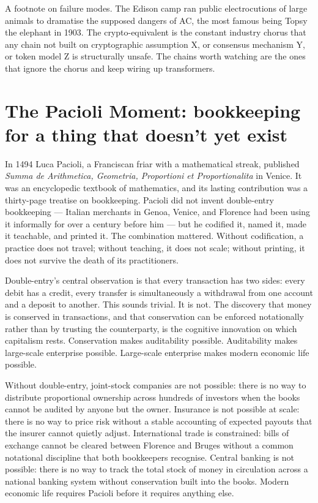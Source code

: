 \documentclass[11pt,a4paper]{article}
\begin{document}
A footnote on failure modes. The Edison camp ran public electrocutions
of large animals to dramatise the supposed dangers of AC, the most
famous being Topsy the elephant in 1903. The crypto-equivalent is the
constant industry chorus that any chain not built on cryptographic
assumption X, or consensus mechanism Y, or token model Z is structurally
unsafe. The chains worth watching are the ones that ignore the chorus
and keep wiring up transformers.

\section{The Pacioli Moment: bookkeeping for a thing that doesn't yet exist}\label{sec:pacioli}

In 1494 Luca Pacioli, a Franciscan friar with a mathematical streak,
published \emph{Summa de Arithmetica, Geometria, Proportioni et
Proportionalita} in Venice. It was an encyclopedic textbook of
mathematics, and its lasting contribution was a thirty-page treatise on
bookkeeping. Pacioli did not invent double-entry bookkeeping --- Italian
merchants in Genoa, Venice, and Florence had been using it informally for
over a century before him --- but he codified it, named it, made it
teachable, and printed it. The combination mattered. Without
codification, a practice does not travel; without teaching, it does not
scale; without printing, it does not survive the death of its
practitioners.

Double-entry's central observation is that every transaction has two
sides: every debit has a credit, every transfer is simultaneously a
withdrawal from one account and a deposit to another. This sounds
trivial. It is not. The discovery that money is conserved in
transactions, and that conservation can be enforced notationally rather
than by trusting the counterparty, is the cognitive innovation on which
capitalism rests. Conservation makes auditability possible. Auditability
makes large-scale enterprise possible. Large-scale enterprise makes
modern economic life possible.

Without double-entry, joint-stock companies are not possible: there is no
way to distribute proportional ownership across hundreds of investors
when the books cannot be audited by anyone but the owner. Insurance is
not possible at scale: there is no way to price risk without a stable
accounting of expected payouts that the insurer cannot quietly adjust.
International trade is constrained: bills of exchange cannot be cleared
between Florence and Bruges without a common notational discipline that
both bookkeepers recognise. Central banking is not possible: there is no
way to track the total stock of money in circulation across a national
banking system without conservation built into the books. Modern economic
life requires Pacioli before it requires anything else.
\end{document}
